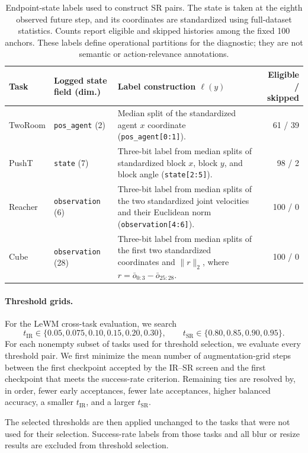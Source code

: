 \documentclass{article}
\newcommand{\code}[1]{\texttt{#1}}
\begin{document}
\begin{table}[H]
\centering
\caption{Endpoint-state labels used to construct SR pairs. The state is taken
at the eighth observed future step, and its coordinates are standardized using
full-dataset statistics. Counts report eligible and skipped histories among
the fixed 100 anchors. These labels define operational partitions for the
diagnostic; they are not semantic or action-relevance annotations.}
\label{tab:sr-labels}
\footnotesize
\setlength{\tabcolsep}{3pt}
\begin{tabularx}{\linewidth}{l l X r}
\toprule
Task & Logged state field (dim.) & Label construction $\ell(y)$ & Eligible / skipped \\
\midrule
TwoRoom & \code{pos\_agent} (2) & Median split of the standardized agent $x$ coordinate (\code{pos\_agent[0:1]}). & 61 / 39 \\
PushT & \code{state} (7) & Three-bit label from median splits of standardized block $x$, block $y$, and block angle (\code{state[2:5]}). & 98 / 2 \\
Reacher & \code{observation} (6) & Three-bit label from median splits of the two standardized joint velocities and their Euclidean norm (\code{observation[4:6]}). & 100 / 0 \\
Cube & \code{observation} (28) & Three-bit label from median splits of the first two standardized coordinates and $\|r\|_2$, where $r=\bar o_{0:3}-\bar o_{25:28}$. & 100 / 0 \\
\bottomrule
\end{tabularx}
\end{table}

\paragraph{Threshold grids.}
For the LeWM cross-task evaluation, we search
\[
t_{\mathrm{IR}}\in\{0.05,0.075,0.10,0.15,0.20,0.30\},
\qquad
t_{\mathrm{SR}}\in\{0.80,0.85,0.90,0.95\}.
\]
For each nonempty subset of tasks used for threshold selection, we evaluate
every threshold pair. We first minimize the mean number of augmentation-grid
steps between the first checkpoint accepted by the IR--SR screen and the
first checkpoint that meets the success-rate criterion. Remaining ties are
resolved by, in order, fewer early acceptances, fewer late acceptances, higher
balanced accuracy, a smaller $t_{\mathrm{IR}}$, and a larger
$t_{\mathrm{SR}}$.

The selected thresholds are then applied unchanged to the tasks that were not
used for their selection. Success-rate labels from those tasks and all blur
or resize results are excluded from threshold selection.
\end{document}
